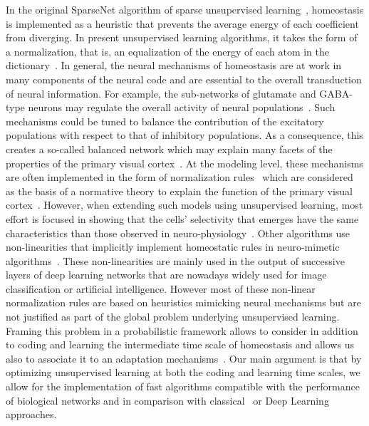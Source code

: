 \documentclass[vision,article,submit,oneauthor,pdftex]{Definitions/mdpi}
\begin{document}
In the original {\sc SparseNet} algorithm of sparse unsupervised learning~\citep{Olshausen97}, homeostasis is implemented as a heuristic that prevents the average energy of each coefficient from diverging. In present unsupervised learning algorithms, it takes the form of a normalization, that is, an equalization of the energy of each atom in the dictionary~\citep{Mairal14}. 
In general, the neural mechanisms of homeostasis are at work in many components of the neural code and are essential to the overall transduction of neural information. For example, the sub-networks of glutamate and GABA-type neurons may regulate the overall activity of neural populations~\citep{Marder2006variability}. Such mechanisms could be tuned to balance the contribution of the excitatory populations with respect to that of inhibitory populations. As a consequence, this creates a so-called balanced network which may explain many facets of the properties of the primary visual cortex~\citep{Hansel12}. At the modeling level, these mechanisms are often implemented in the form of normalization rules~\citep{Schwartz01} which are considered as the basis of a normative theory to explain the function of the primary visual cortex~\citep{Carandini12}. However, when extending such models using unsupervised learning, most effort is focused in showing that the cells' selectivity that emerges have the same characteristics than those observed in neuro-physiology~\citep{Ringach02,Rehn07, Loxley17}. Other algorithms use non-linearities that implicitly implement homeostatic rules in neuro-mimetic algorithms~\citep{Brito16}. These non-linearities are mainly used in the output of successive layers of deep learning networks that are nowadays widely used for image classification or artificial intelligence. However most of these non-linear normalization rules are based on heuristics mimicking neural mechanisms but are not justified as part of the global problem underlying unsupervised learning. Framing this problem in a probabilistic framework allows to consider in addition to coding and learning the intermediate time scale of homeostasis and allows us also to associate it to an adaptation mechanisms~\citep{Rao99}. Our main argument is that by optimizing unsupervised learning at both the coding and learning time scales, we allow for the implementation of fast algorithms compatible with the performance of biological networks and in comparison with classical~\citep{Olshausen97} or Deep Learning approaches.
\end{document}

